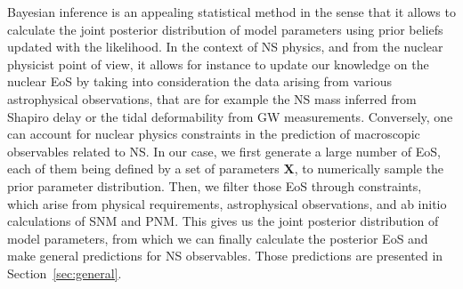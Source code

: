 Bayesian inference is an appealing statistical method in the sense that it 
allows to calculate the joint posterior distribution of model parameters using 
prior beliefs updated with the likelihood. In the context of NS physics, and 
from the nuclear physicist point of view, it allows for instance to update our 
knowledge on the nuclear EoS by taking into consideration the data arising from 
various astrophysical observations, that are for example the NS mass inferred
from Shapiro delay or the tidal deformability from GW measurements.
Conversely, one can account for nuclear physics constraints in the prediction 
of macroscopic observables related to NS. 
In our case, we first generate a large number of EoS, each of them being 
defined by a set of parameters $\bm{X}$, to numerically sample the prior 
parameter distribution. Then, we filter those EoS through constraints, which 
arise from physical requirements, astrophysical observations, and ab initio
calculations of SNM and PNM. This 
gives us the joint posterior distribution of model parameters, from which we 
can finally calculate the posterior EoS and make general predictions for NS 
observables. Those predictions are presented in Section~\ref{sec:general}.

